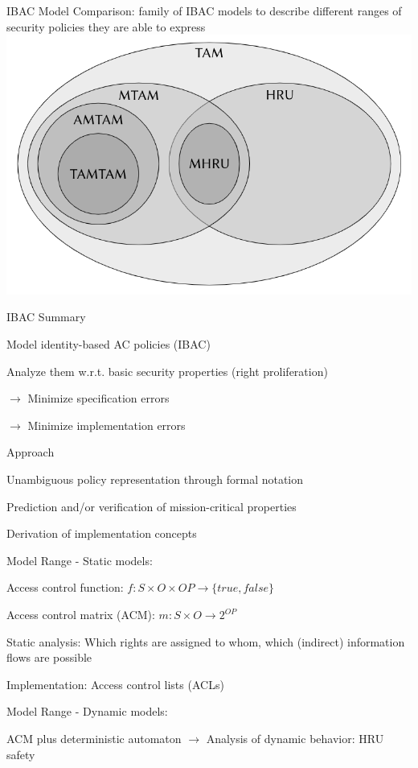 \documentclass[a4paper]{article}
\begin{document}
\begin{multicols}{3}
    IBAC Model Comparison: family of IBAC models to describe different ranges of security policies they are able to express
    \includegraphics[width=.5\linewidth]{Assets/Systemsicherheit-ibac-model-comparison.png}

    IBAC Summary
    \begin{itemize*}
        \item Model identity-based AC policies (IBAC)
        \item Analyze them w.r.t. basic security properties (right proliferation)
        \item $\rightarrow$  Minimize specification errors
        \item $\rightarrow$  Minimize implementation errors
        \item Approach
        \begin{itemize*}
            \item Unambiguous policy representation through formal notation
            \item Prediction and/or verification of mission-critical properties
            \item Derivation of implementation concepts
        \end{itemize*}
        \item Model Range - Static models:
        \begin{itemize*}
            \item Access control function: $f:S\times O\times OP\rightarrow \{true,false\}$
            \item Access control matrix (ACM): $m:S\times O\rightarrow 2^{OP}$
            \item Static analysis: Which rights are assigned to whom, which (indirect) information flows are possible
            \item Implementation: Access control lists (ACLs)
        \end{itemize*}
        \item Model Range - Dynamic models:
        \begin{itemize*}
            \item ACM plus deterministic automaton $\rightarrow$ Analysis of dynamic behavior: HRU safety

\end{itemize*}
\end{itemize*}
\end{multicols}
\end{document}
